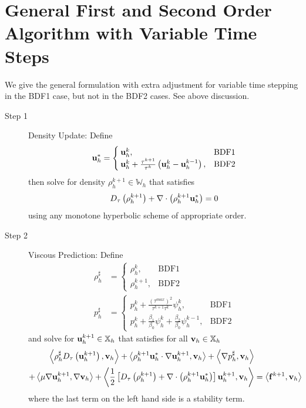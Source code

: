 \documentclass[letterpaper]{erdc}
\begin{document}
%
%
%
\section{General First and Second Order Algorithm with Variable Time Steps}
\label{sec:GeneralAlgorithm}

We give the general formulation with extra adjustment for variable time
stepping in the BDF1 case, but not in the BDF2 cases.  See above discussion.

\begin{description}
\item[Step 1] Density Update: Define
\begin{equation}
  \textbf{u}_h^{*} = \begin{cases}
                \textbf{u}_h^{k}, & \mbox{BDF1} \\
                \textbf{u}_h^{k} + \frac{\tau^{k+1}}{\tau^k}\left( \textbf{u}_h^{k} - \textbf{u}_h^{k-1}\right), & \mbox{BDF2} 
               \end{cases}
 \end{equation}
then solve for density $\rho_h^{k+1}\in \mathbb{W}_h$ that satisfies
\begin{equation}\label{eqn:generaldensity}
D_{\tau}\left(\rho_h^{k+1}\right) + \nabla\cdot\left( \rho_h^{k+1}\textbf{u}_h^{*} \right) = 0
\end{equation}
using any monotone hyperbolic scheme of appropriate order. 

\item[Step 2] Viscous Prediction: Define
\begin{align}
  \rho_h^{\sharp} &= \begin{cases}
                       \rho_h^{k}, & \mbox{BDF1} \\
                       \rho_h^{k+1}, & \mbox{BDF2} 
                      \end{cases}\\
  p_h^{\sharp} &= \begin{cases}
                  p_h^{k} + \frac{\left(\tau^{max}\right)^2}{\tau^{k+1}\tau^{k}}\psi_h^{k}, & \mbox{BDF1}\\ 
                  p_h^{k} + \frac{\beta_1}{\beta_0}\psi_h^{k} + \frac{\beta_2}{\beta_0}\psi_h^{k-1}, & \mbox{BDF2} 
                 \end{cases}
\end{align}
and solve for $\textbf{u}_h^{k+1}\in\mathbb{X}_h$ that satisfies for all
$\textbf{v}_h\in\mathbb{X}_h$
\begin{equation}\label{eqn:generalvelocity}
  \begin{split}
    \left\langle \rho_h^{\sharp}D_{\tau}\left(\textbf{u}_h^{k+1}\right), \textbf{v}_h \right\rangle  + \left\langle \rho_h^{k+1}\textbf{u}_h^{*}\cdot\nabla\textbf{u}_h^{k+1}, \textbf{v}_h \right\rangle +\left\langle \nabla p_h^{\sharp}, \textbf{v}_h \right\rangle &\\
     + \left\langle \mu\nabla\textbf{u}_h^{k+1}, \nabla\textbf{v}_h \right\rangle  + \left\langle \frac{1}{2}\left[ D_{\tau}\left(\rho_h^{k+1}\right) + \nabla\cdot\left( \rho_h^{k+1}\textbf{u}_h^{*} \right)\right] \textbf{u}_h^{k+1}, \textbf{v}_h \right\rangle &= \left\langle \mathbf{f}^{k+1}, \textbf{v}_h \right\rangle
  \end{split}
\end{equation}
where the last term on the left hand side is a stability term.


\end{description}
\end{document}
